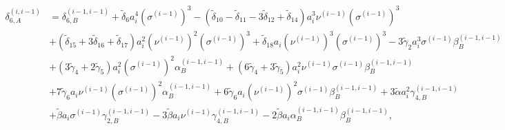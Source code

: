 \documentclass[12pt]{article}
\begin{document}
{\footnotesize
\begin{equation}
  \begin{aligned}
    \delta_{6, A}^{(i, i-1)} &= \delta_{6, B}^{(i-1, i-1)} + \tilde{\delta}_{6} a_{i}^{4} \left( \sigma^{(i-1)} \right)^{3} - \left( \tilde{\delta}_{10} - \tilde{\delta}_{11} - 3 \tilde{\delta}_{12} + \tilde{\delta}_{14} \right) a_{i}^{3} \nu^{(i-1)}\left( \sigma^{(i-1)} \right)^{3} \\
    & + \left( \tilde{\delta}_{15} + 3 \tilde{\delta}_{16} + \tilde{\delta}_{17} \right) a_{i}^{2} \left( \nu^{(i-1)} \right)^{2} \left( \sigma^{(i-1)} \right)^{3} + \tilde{\delta}_{18} a_{i} \left( \nu^{(i-1)} \right)^{3} \left( \sigma^{(i-1)} \right)^{3} - 3 \tilde{\gamma}_{2} a_{i}^{3} \sigma^{(i-1)} \beta_{B}^{(i-1, i-1)} \\
    & + \left( 3 \tilde{\gamma}_{4} + 2 \tilde{\gamma}_{5} \right) a_{i}^{2} \left( \sigma^{(i-1)} \right)^{2} \alpha_{B}^{(i-1, i-1)} + \left( 6 \tilde{\gamma}_{4} + 3 \tilde{\gamma}_{5} \right) a_{i}^{2} \nu^{(i-1)} \sigma^{(i-1)} \beta_{B}^{(i-1, i-1)} \\
    & + 7 \tilde{\gamma}_{6} a_{i} \nu^{(i-1)} \left( \sigma^{(i-1)} \right)^{2} \alpha_{B}^{(i-1, i-1)} + 6 \tilde{\gamma}_{6} a_{i} \left( \nu^{(i-1)} \right)^{2} \sigma^{(i-1)} \beta_{B}^{(i-1, i-1)} + 3 \tilde{\alpha} a_{i}^{2} \gamma_{4, B}^{(i-1, i-1)} \\
    & + \tilde{\beta} a_{i} \sigma^{(i-1)} \gamma_{2, B}^{(i-1, i-1)} - 3 \tilde{\beta} a_{i} \nu^{(i-1)} \gamma_{4, B}^{(i-1, i-1)} - 2 \tilde{\beta} a_{i} \alpha_{B}^{(i-1, i-1)} \beta_{B}^{(i-1, i-1)},
  \end{aligned}
\end{equation}
}
\end{document}

